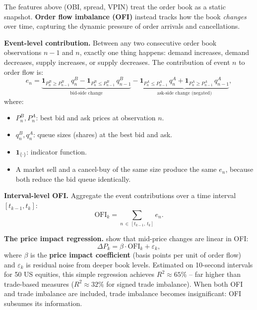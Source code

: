 The features above (OBI, spread, VPIN) treat the order book as a static snapshot.
\textbf{Order flow imbalance (OFI)} \citep{ContKukanovStoikov2014} instead tracks how the book \emph{changes} over time, capturing the dynamic pressure of order arrivals and cancellations.

\textbf{Event-level contribution.}
Between any two consecutive order book observations $n-1$ and $n$, exactly one thing happens: demand increases, demand decreases, supply increases, or supply decreases.
The contribution of event $n$ to order flow is:
\begin{equation}\label{eq:ofi-event}
e_n = \underbrace{\mathbf{1}_{P_n^B \geq P_{n-1}^B}\,q_n^B - \mathbf{1}_{P_n^B \leq P_{n-1}^B}\,q_{n-1}^B}_{\text{bid-side change}}
    - \underbrace{\mathbf{1}_{P_n^A \leq P_{n-1}^A}\,q_n^A + \mathbf{1}_{P_n^A \geq P_{n-1}^A}\,q_{n-1}^A}_{\text{ask-side change \ (negated)}},
\end{equation}
where:
\begin{itemize}[nosep]
  \item $P_n^B, P_n^A$: best bid and ask prices at observation $n$.
  \item $q_n^B, q_n^A$: queue sizes (shares) at the best bid and ask.
  \item $\mathbf{1}_{\{\cdot\}}$: indicator function.
  \item A market sell and a cancel-buy of the same size produce the same $e_n$, because both reduce the bid queue identically.
\end{itemize}

\textbf{Interval-level OFI.}
Aggregate the event contributions over a time interval $[t_{k-1}, t_k]$:
\begin{equation}\label{eq:ofi}
\text{OFI}_k = \sum_{n \,\in\, [t_{k-1},\, t_k]} e_n.
\end{equation}

\textbf{The price impact regression.}
\citet{ContKukanovStoikov2014} show that mid-price changes are linear in OFI:
\begin{equation}\label{eq:ofi-regression}
\Delta P_k = \beta \cdot \text{OFI}_k + \varepsilon_k,
\end{equation}
where $\beta$ is the \textbf{price impact coefficient} (basis points per unit of order flow) and $\varepsilon_k$ is residual noise from deeper book levels.
Estimated on 10-second intervals for 50 US equities, this simple regression achieves $R^2 \approx 65\%$ -- far higher than trade-based measures ($R^2 \approx 32\%$ for signed trade imbalance).
When both OFI and trade imbalance are included, trade imbalance becomes insignificant: OFI subsumes its information.


